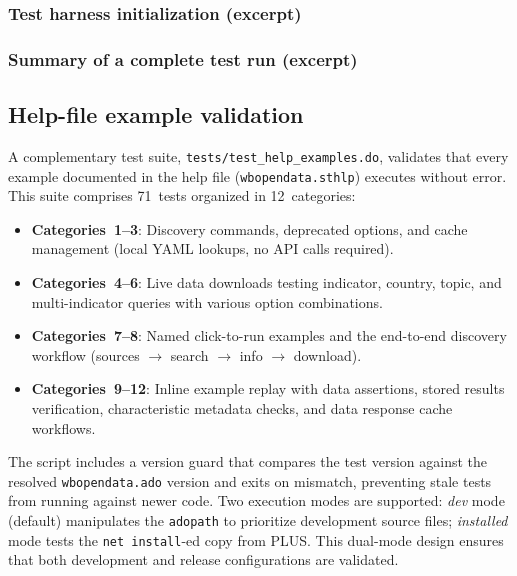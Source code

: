 \documentclass[bib]{statapress}
\begin{document}
\subsubsection{Test harness initialization (excerpt)}
\begin{stlog}
\nullskip
\end{stlog}

\subsubsection{Summary of a complete test run (excerpt)}
\begin{stlog}
\nullskip
\end{stlog}

\subsection{Help-file example validation}

A complementary test suite, \texttt{tests/test\_help\_examples.do}, validates
that every example documented in the help file (\texttt{wbopendata.sthlp})
executes without error. This suite comprises 71~tests organized in 12~categories:

\begin{itemize}
  \item \textbf{Categories~1--3}: Discovery commands, deprecated options, and cache
    management (local YAML lookups, no API calls required).
  \item \textbf{Categories~4--6}: Live data downloads testing indicator, country,
    topic, and multi-indicator queries with various option combinations.
  \item \textbf{Categories~7--8}: Named click-to-run examples and the end-to-end
    discovery workflow (sources $\to$ search $\to$ info $\to$ download).
  \item \textbf{Categories~9--12}: Inline example replay with data assertions,
    stored results verification, characteristic metadata checks, and data
    response cache workflows.
\end{itemize}

The script includes a version guard that compares the test version against
the resolved \texttt{wbopendata.ado} version and exits on mismatch,
preventing stale tests from running against newer code. Two execution modes
are supported: \emph{dev} mode (default) manipulates the \texttt{adopath}
to prioritize development source files; \emph{installed} mode tests the
\texttt{net install}-ed copy from PLUS. This dual-mode design ensures that
both development and release configurations are validated.
\end{document}
